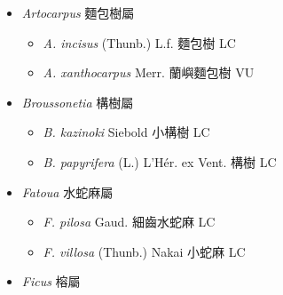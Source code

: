 
  \begin{itemize}
 \item[] \textit{Artocarpus} 麵包樹屬
                                
  \begin{itemize}
        \item[] \textit{A. incisus} (Thunb.) L.f.  麵包樹   LC
        \item[] \textit{A. xanthocarpus} Merr.  蘭嶼麵包樹   VU
  \end{itemize}
 \item[] \textit{Broussonetia} 構樹屬
                                
  \begin{itemize}
        \item[] \textit{B. kazinoki} Siebold  小構樹   LC
        \item[] \textit{B. papyrifera} (L.) L'Hér. ex Vent.  構樹   LC
  \end{itemize}
 \item[] \textit{Fatoua} 水蛇麻屬
                                
  \begin{itemize}
        \item[] \textit{F. pilosa} Gaud.  細齒水蛇麻   LC
        \item[] \textit{F. villosa} (Thunb.) Nakai  小蛇麻   LC
  \end{itemize}
 \item[] \textit{Ficus} 榕屬
                                

\end{itemize}
